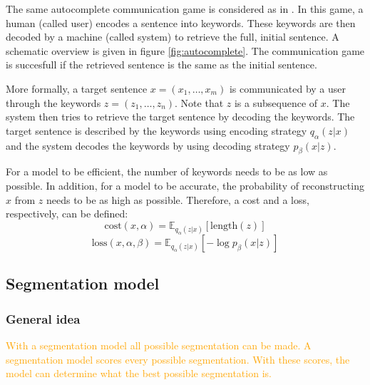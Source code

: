 \documentclass[a4paper, 12pt]{report}
\begin{document}
The same autocomplete communication game is considered as in . In this game, a human (called user) encodes a sentence into keywords. 
These keywords are then decoded by a machine (called system) to retrieve the full, initial sentence. 
A schematic overview is given in figure \ref{fig:autocomplete}. 
The communication game is succesfull if the retrieved sentence is the same as the initial sentence. 

More formally, a target sentence $x=(x_1, \dots, x_m)$ is communicated by a user through the keywords $z=(z_1, \dots, z_n)$. 
Note that $z$ is a subsequence of $x$. 
The system then tries to retrieve the target sentence by decoding the keywords. 
The target sentence is described by the keywords using encoding strategy $q_{\alpha}(z | x)$ and the system decodes the keywords by using decoding strategy $p_{\beta}(x|z)$. 

For a model to be efficient, the number of keywords needs to be as low as possible. 
In addition, for a model to be accurate, the probability of reconstructing $x$ from $z$ needs to be as high as possible. 
Therefore, a cost and a loss, respectively, can be defined:
\begin{equation}
    \label{eq:cost}
    \text{cost}(x,\alpha) = \mathbb{E}_{q_{\alpha}(z|x)} [\text{length}(z)]
\end{equation}
\begin{equation}
    \label{eq:loss}
    \text{loss}(x,\alpha,\beta) = \mathbb{E}_{q_{\alpha}(z|x)} [-\log p_{\beta}(x|z)]
\end{equation}

\subsection{Segmentation model}

\subsubsection{General idea}
\textcolor{orange}{With a segmentation model all possible segmentation can be made. 
A segmentation model scores every possible segmentation.
With these scores, the model can determine what the best possible segmentation is.}
\end{document}
